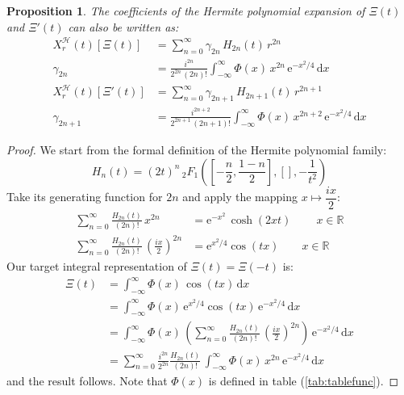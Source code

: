 \documentclass[a4paper,11pt,twoside]{amsart}
\newtheorem{proposition}[theorem]{Proposition}
\newcommand{\verifiedeq}{=}
\newcommand{\defeq}{=}
\newcommand{\verifiedeq}{\stackrel{\checkmark}{=}}
\newcommand{\defeq}{\stackrel{\scriptscriptstyle \textnormal{def}}{=}}
\begin{document}
\begin{proposition}
The coefficients of the Hermite polynomial expansion of $\Xi(t)$ and $\Xi'(t)$ can also be written as: 
\begin{align}
X^{\mathcal{H}}_r(t)\left[\Xi(t)\right] &\verifiedeq \sum_{n=0}^\infty \gamma_{2n}\,H_{2n}(t)\,r^{2n} \label{herm1}\\ 
\gamma_{2n} &\verifiedeq \frac{i^{2n}}{2^{2n}\,(2n)!}\int_{-\infty}^{\infty} \Phi(x)\,x^{2n}\,\mathrm{e}^{-x^2/4}\,\mathrm{d}x \\
X^{\mathcal{H}}_r(t)\left[\Xi'(t)\right] &\verifiedeq \sum_{n=0}^\infty \gamma_{2n+1}\,H_{2n+1}(t)\,r^{2n+1} \label{herm2}\\ 
\gamma_{2n+1} &\verifiedeq \frac{i^{2n+2}}{2^{2n+1}\,(2n+1)!}\int_{-\infty}^{\infty} \Phi(x)\,x^{2n+2}\,\mathrm{e}^{-x^2/4}\,\mathrm{d}x
\end{align}
\end{proposition}
\begin{proof}
We start from the formal definition of the Hermite polynomial family:
\begin{equation}
 H_n(t) \defeq (2t)^n\, {}_2F_1\left(\left[-\frac{n}{2}, \frac{1-n}{2}\right],[],-\frac{1}{t^2}\right) 
\end{equation}
Take its generating function for $2n$ and apply the mapping $x \mapsto \dfrac{ix}{2}$:
\begin{align}
 \sum_{n=0}^\infty \frac{H_{2n}(t)}{(2n)!}\, x^{2n} &\verifiedeq \mathrm{e}^{-x^2}\,\cosh(2xt) \ \qquad x \in \mathbb{R} \\
 \sum_{n=0}^\infty \frac{H_{2n}(t)}{(2n)!}\,\left(\frac{ix}{2}\right)^{2n} &\verifiedeq  \mathrm{e}^{x^2/4} \cos(tx)\qquad x \in \mathbb{R}
\end{align}
Our target integral representation of $\Xi(t) = \Xi(-t)$ is:
\begin{align}
 \Xi(t) &\verifiedeq \int_{-\infty}^\infty \Phi(x)\,\cos(tx)\, \mathrm{d}x \\
  & \verifiedeq \int_{-\infty}^\infty \Phi(x)\,\mathrm{e}^{x^2/4}\cos(tx)\,\mathrm{e}^{-x^2/4}\,\mathrm{d}x \\
  & \verifiedeq \int_{-\infty}^\infty \Phi(x)\,\left(\sum_{n=0}^\infty \frac{H_{2n}(t)}{(2n)!}\,\left(\frac{ix}{2}\right)^{2n} \right)\,\mathrm{e}^{-x^2/4}\,\mathrm{d}x \\
  & \verifiedeq \sum_{n=0}^\infty \frac{i^{2n}}{2^{2n}}\frac{H_{2n}(t)}{(2n)!}\,\int_{-\infty}^\infty \Phi(x)\,x^{2n}\,\mathrm{e}^{-x^2/4}\,\mathrm{d}x
\end{align}
and the result follows. Note that $\Phi(x)$ is defined in table (\ref{tab:tablefunc}).
\end{proof}
\end{document}
